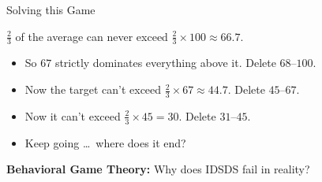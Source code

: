 
\begin{frame}{Solving this Game}
\begin{center}
\end{center}
$\tfrac{2}{3}$ of the average can never exceed $\tfrac{2}{3}\times 100\approx 66.7$.
\begin{itemize}
    \item So $67$ strictly dominates everything above it. Delete $68$--$100$. \vspace{0.25in}
    \item Now the target can't exceed $\tfrac{2}{3}\times 67\approx 44.7$. Delete $45$--$67$. \vspace{0.25in}
    \item Now it can't exceed $\tfrac{2}{3}\times 45=30$. Delete $31$--$45$. \vspace{0.25in}
    \item Keep going \ldots \ where does it end? \vspace{0.25in}
\end{itemize}
\textbf{Behavioral Game Theory:} Why does IDSDS fail in reality?
\vspace{-0.3in}
\end{frame}

